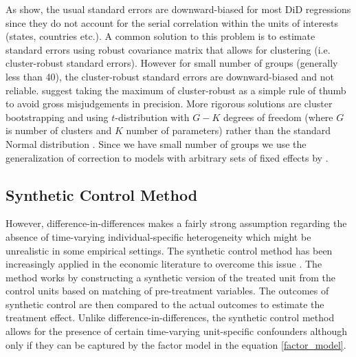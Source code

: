As \citet{bertrand_how_2004} show, the usual standard errors  are downward-biased for most DiD regressions since they do not account for the serial correlation within the units of interests (states, countries etc.). A common solution to this problem is to estimate standard errors using robust covariance matrix that allows for clustering (i.e. cluster-robust standard errors). However for small number of groups (generally less than 40), the cluster-robust standard errors are downward-biased and not reliable. \citet[chapter 8]{angrist_mostly_2009} suggest taking the maximum of cluster-robust as a simple rule of thumb to avoid gross misjudgements in precision. More rigorous solutions are cluster bootstrapping \citep{cameron_bootstrap-based_2008, cameron_practitioners_2015} and  using $t$-distribution with $G- K$ degrees of freedom (where $G$ is number of clusters and $K$ number of parameters) rather than the standard Normal distribution \citep{mccaffrey_bias_2002, imbens_robust_2016}.
Since we have small number of groups we use the generalization of \citet{mccaffrey_bias_2002} correction to models with arbitrary sets of fixed effects by \citet{pustejovsky_small-sample_2018}.


\subsection{Synthetic Control Method} \label{subsec:sc_methodology}
However, difference-in-differences makes a fairly strong assumption regarding the absence of time-varying individual-specific heterogeneity which might be unrealistic in some empirical settings.
The synthetic control method has been increasingly applied in the economic literature to overcome this issue \citep{abadie_economic_2003, abadie_synthetic_2010, billmeier_assessing_2013, cavallo_catastrophic_2013}. The method works by constructing a synthetic version of the treated unit from the control units  based on matching of pre-treatment variables. The outcomes of synthetic control are then compared to the actual outcomes  to estimate the treatment effect.
Unlike difference-in-differences, the synthetic control method allows for the presence of certain time-varying unit-specific confounders although only if they can be  captured by the factor model in the equation \ref{factor_model}.



